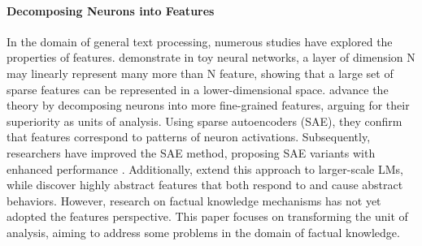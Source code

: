 \paragraph{Decomposing Neurons into Features}
In the domain of general text processing, numerous studies have explored the properties of features. 
\citet{elhage2022superposition} demonstrate in toy neural networks, a layer of dimension N may linearly represent many more than N feature, showing that a large set of sparse features can be represented in a lower-dimensional space.
\citet{bricken2023monosemanticity} advance the theory by decomposing neurons into more fine-grained features, arguing for their superiority as units of analysis. Using sparse autoencoders (SAE), they confirm that features correspond to patterns of neuron activations. Subsequently, researchers have improved the SAE method, proposing SAE variants with enhanced performance \citep{rajamanoharan2024improving,gao2024scaling}. Additionally, \citet{huben2024sparse} extend this approach to larger-scale LMs, while \citet{templeton2024scaling} discover highly abstract features that both respond to and cause abstract behaviors.
However, research on factual knowledge mechanisms has not yet adopted the features perspective. This paper focuses on transforming the unit of analysis, aiming to address some problems in the domain of factual knowledge.

\vspace{-3mm}